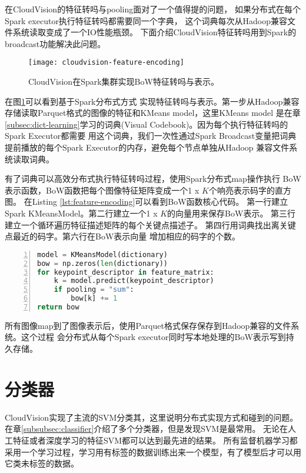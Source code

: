在CloudVision的特征转吗与pooling面对了一个值得提的问题，
如果分布式在每个Spark executor执行特征转吗都需要同一个字典，
这个词典每次从Hadoop兼容文件系统读取变成了一个IO性能瓶颈。
下面介绍CloudVision特征转吗用到Spark的broadcast功能解决此问题。


\begin{figure}[h]
  \centering
    \texttt{[image: cloudvision-feature-encoding]}
  \caption{CloudVision在Spark集群实现BoW特征转吗与表示。}
  \label{fig:cloudvision-feature-encoding}
\end{figure}
在图\ref{fig:cloudvision-feature-encoding}可以看到基于Spark分布式方式
实现特征转吗与表示。第一步从Hadoop兼容存储读取Parquet格式的图像的特征和KMeans model，这里KMeans model
是在章\ref{subsec:dict-learning}学习的词典(Visual Codebook)。因为每个执行特征转吗的Spark Executor都需要
用这个词典，我们一次性通过Spark Broadcast变量把词典提前播放的每个Spark Executor的内存，避免每个节点单独从Hadoop
兼容文件系统读取词典。\cite{spark-programming-guide}

有了词典可以高效分布式执行特征转吗过程，使用Spark分布式map操作执行
BoW表示函数，BoW函数把每个图像特征矩阵变成一个1 x $K$个响亮表示码字的直方图。
在Listing \ref{lst:feature-encoding}可以看到BoW函数核心代码。
第一行建立Spark KMeansModel。第二行建立一个1 x $K$的向量用来保存BoW表示。
第三行建立一个循环遍历特征描述矩阵的每个关键点描述子。
第四行用词典找出离关键点最近的码字。第六行在BoW表示向量
增加相应的码字的个数。
\begin{lstlisting}[language=Python,
                   basicstyle=\small,
                   numbers=left,
                   showstringspaces=false,
                   caption={BoW特征转吗核心代码},
                   label={lst:feature-encoding}]
model = KMeansModel(dictionary)
bow = np.zeros(len(dictionary))
for keypoint_descriptor in feature_matrix:
    k = model.predict(keypoint_descriptor)
    if pooling = "sum":
        bow[k] += 1
return bow
\end{lstlisting}

所有图像map到了图像表示后，使用Parquet格式保存保存到Hadoop兼容的文件系统。这个过程
会分布式从每个Spark executor同时写本地处理的BoW表示写到持久存储。


\section{分类器}
\label{sec:cloudvision_classifier}
CloudVision实现了主流的SVM分类其，这里说明分布式实现方式和碰到的问题。
在章\ref{subsubsec:classifier}介绍了多个分类器，但是发现SVM是最常用。
无论在人工特征或者深度学习的特征SVM都可以达到最先进的结果。
所有监督机器学习都采用一个学习过程，学习用有标签的数据训练出来一个模型，有了模型后才可以用
它类未标签的数据。


